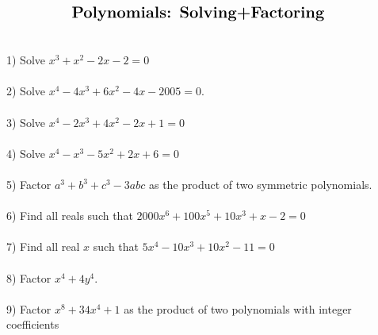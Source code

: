 \documentclass{article}
\begin{document}
$\centerline{\Large \textbf{Polynomials: Solving+Factoring}}$
\\
\\
\\
1) Solve $x^3+x^2-2x-2=0$
\\
\\
2) Solve $x^4-4x^3+6x^2-4x-2005=0$.
\\
\\
3) Solve $x^4-2x^3+4x^2-2x+1=0$
\\
\\
4) Solve $x^4-x^3-5x^2+2x+6=0$
\\
\\
5) Factor $a^3+b^3+c^3-3abc$ as the product of two symmetric polynomials.
\\
\\
6) Find all reals such that $2000x^6+100x^5+10x^3+x-2=0$
\\
\\
7) Find all real $x$ such that $5x^4-10x^3+10x^2-11=0$
\\
\\
8) Factor $x^4+4y^4$.
\\
\\
9) Factor $x^8+34x^4+1$ as the product of two polynomials with integer coefficients
\\
\\
\end{document}
